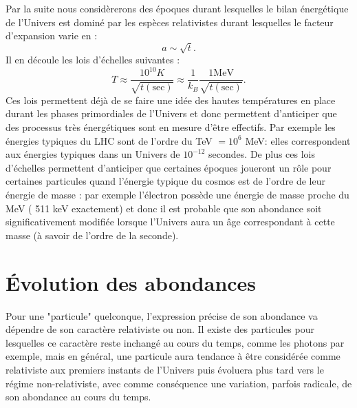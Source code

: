Par la suite nous considèrerons des époques durant lesquelles le bilan énergétique de l'Univers est dominé par les espèces relativistes durant lesquelles le facteur d'expansion varie en :
\begin{equation}
a\sim \sqrt t.
\end{equation}
Il en découle les lois d'échelles suivantes :
\begin{equation}
T\approx\frac{10^{10} K}{\sqrt{t\mathrm{(sec)}}} \approx \frac{1}{k_B}\frac{1 \mathrm{MeV}}{\sqrt{t\mathrm{(sec)}}}.
\end{equation}
Ces lois permettent déjà de se faire une idée des hautes températures en place durant les phases primordiales de l'Univers et donc permettent d'anticiper que des processus très énergétiques sont en mesure d'être effectifs. Par exemple les énergies typiques du LHC sont de l'ordre du TeV $=10^6$ MeV: elles correspondent aux énergies typiques dans un Univers de $10^{-12}$ secondes. De plus ces lois d'échelles permettent d'anticiper que certaines époques joueront un rôle pour certaines particules quand l'énergie typique du cosmos est de l'ordre de leur énergie de masse : par exemple l'électron possède une énergie de masse proche du MeV ( 511 keV exactement) et donc il est probable que son abondance soit significativement modifiée lorsque l'Univers aura un âge correspondant à cette masse (à savoir de l'ordre de la seconde).


\section{Évolution des abondances}
Pour une "particule" quelconque, l'expression précise de son abondance va dépendre de son caractère relativiste ou non. Il existe des particules pour lesquelles ce caractère reste inchangé au cours du temps, comme les photons par exemple, mais en général, une particule aura tendance à être considérée comme relativiste aux premiers instants de l'Univers puis évoluera plus tard vers le régime non-relativiste, avec comme conséquence une variation, parfois radicale, de son abondance au cours du temps.

